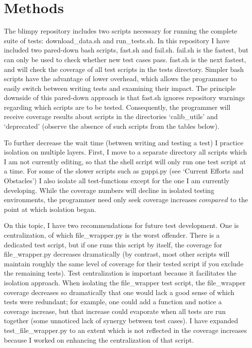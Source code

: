 \documentclass[12pt]{article}
\begin{document}
\section{Methods}

\quad \quad The blimpy repository includes two scripts necessary for running the complete suite of tests: download\_data.sh and run\_tests.sh. In this repository I have included two pared-down bash scripts, fast.sh and fail.sh. fail.sh is the fastest, but can only be used to check whether new test cases pass. fast.sh is the next fastest, and will check the coverage of all test scripts in the tests directory. Simpler bash scripts have the advantage of lower overhead, which allows the programmer to easily switch between writing tests and examining their impact. The principle downside of this pared-down approach is that fast.sh ignores repository warnings regarding which scripts are to be tested. Consequently, the programmer will receive coverage results about scripts in the directories `calib\_utils' and `deprecated' (observe the absence of such scripts from the tables below).

To further decrease the wait time (between writing and testing a test) I practice isolation on multiple layers. First, I move to a separate directory all scripts which I am not currently editing, so that the shell script will only run one test script at a time. For some of the slower scripts such as guppi.py (see `Current Efforts and Obstacles') I also isolate all test-functions except for the one I am currently developing. While the coverage numbers will decline in isolated testing environments, the programmer need only seek coverage increases $compared$ to the point at which isolation began.

On this topic, I have two recommendations for future test development. One is centralization, of which file\_wrapper.py is the worst offender. There is a dedicated test script, but if one runs this script by itself, the coverage for file\_wrapper.py decreases dramatically (by contrast, most other scripts will maintain roughly the same level of coverage for their tested script if you exclude the remaining tests). Test centralization is important because it facilitates the isolation approach. When isolating the file\_wrapper test script, the file\_wrapper coverage decreases so dramatically that one would lack a good sense of which tests were redundant; for example, one could add a function and notice a coverage increase, but that increase could evaporate when all tests are run together (some unnoticed lack of synergy between test cases). I have expanded test\_file\_wrapper.py to an extent which is not reflected in the coverage increases because I worked on enhancing the centralization of that script.
\end{document}

